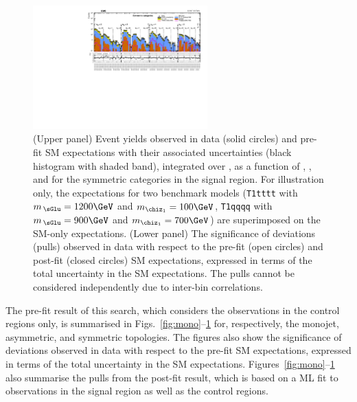 \begin{figure}[!h]
  \begin{center}
    \includegraphics[angle=90,width=0.60\textwidth]{figures/result/v4/summaryPlot_Symmetric_prefit_overlay_fit_b}
    \caption{(Upper panel) Event yields observed in data (solid
      circles) and pre-fit SM expectations with their associated
      uncertainties (black histogram with shaded band), integrated
      over \HTmiss, as a function of \njet, \nb, and \scalht for the
      symmetric \njet categories in the signal region. For
      illustration only, the expectations for two benchmark models
      (\texttt{T1tttt} with $m_{\,\sGlu} = 1200\GeV$ and $m_{\chiz_1}
      = 100\GeV$, \texttt{T1qqqq} with $m_{\,\sGlu} = 900\GeV$ and
      $m_{\chiz_1} = 700\GeV$) are superimposed on the SM-only
      expectations. (Lower panel) The significance of deviations
      (pulls) observed in data with respect to the pre-fit (open
      circles) and post-fit (closed circles) SM expectations,
      expressed in terms of the total uncertainty in the SM
      expectations. The pulls cannot be considered independently due
      to inter-bin correlations.}
    \label{fig:sym}
  \end{center}
\end{figure}

The pre-fit result of this search, which considers the
observations in the control regions only, is summarised in
Figs.~\ref{fig:mono}--\ref{fig:sym} for, respectively, the monojet,
asymmetric, and symmetric topologies.
The figures also show the significance of deviations observed in data
with respect to the pre-fit SM expectations, expressed in terms of
the total uncertainty in the SM
expectations. Figures~\ref{fig:mono}--\ref{fig:sym} also summarise the
pulls from the post-fit result, which is based on a ML fit to
observations in the signal region as well as the control regions.

